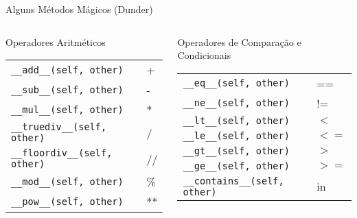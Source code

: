 \begin{frame}{Alguns Métodos Mágicos (Dunder)}

\begin{columns}[T] %

\begin{column}{0.48\textwidth}
\begin{block}{Operadores Aritméticos}
\begin{tabular}{ll}
\texttt{\_\_add\_\_(self, other)} & + \\
\texttt{\_\_sub\_\_(self, other)} & - \\
\texttt{\_\_mul\_\_(self, other)} & * \\
\texttt{\_\_truediv\_\_(self, other)} & / \\
\texttt{\_\_floordiv\_\_(self, other)} & // \\
\texttt{\_\_mod\_\_(self, other)} & \% \\
\texttt{\_\_pow\_\_(self, other)} & **
\end{tabular}
\end{block}
\end{column}

\begin{column}{0.48\textwidth}
\begin{block}{Operadores de Comparação e Condicionais}
\begin{tabular}{ll}
\texttt{\_\_eq\_\_(self, other)} & == \\
\texttt{\_\_ne\_\_(self, other)} & != \\
\texttt{\_\_lt\_\_(self, other)} & $<$ \\
\texttt{\_\_le\_\_(self, other)} & $<=$ \\
\texttt{\_\_gt\_\_(self, other)} & $>$ \\
\texttt{\_\_ge\_\_(self, other)} & $>=$ \\
\texttt{\_\_contains\_\_(self, other)} & in
\end{tabular}
\end{block}
\end{column}

\end{columns}

\end{frame}



